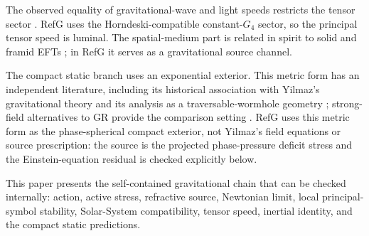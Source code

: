 \documentclass[12pt,a4paper]{article}
\begin{document}
The observed equality of gravitational-wave and light speeds restricts the tensor sector \cite{Abbott2017GW,Abbott2017GRB,Creminelli2017,Sakstein2017}. RefG uses the Horndeski-compatible constant-$G_4$ sector, so the principal tensor speed is luminal. The spatial-medium part is related in spirit to solid and framid EFTs \cite{Endlich2013,Nicolis2015,Endlich2014,Bordin2017}; in RefG it serves as a gravitational source channel.

The compact static branch uses an exponential exterior. This metric form has an independent literature, including its historical association with Yilmaz's gravitational theory \cite{Yilmaz1958} and its analysis as a traversable-wormhole geometry \cite{Boonserm2018}; strong-field alternatives to GR provide the comparison setting \cite{Damour1992,Damour1993,Damour1996}. RefG uses this metric form as the phase-spherical compact exterior, not Yilmaz's field equations or source prescription: the source is the projected phase-pressure deficit stress and the Einstein-equation residual is checked explicitly below.

This paper presents the self-contained gravitational chain that can be checked internally: action, active stress, refractive source, Newtonian limit, local principal-symbol stability, Solar-System compatibility, tensor speed, inertial identity, and the compact static predictions.

\medskip
\end{document}
